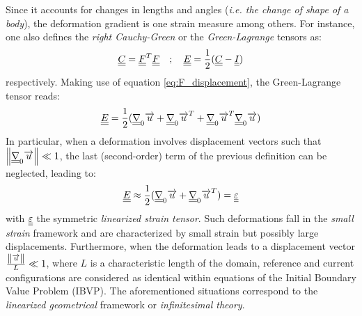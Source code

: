 Since it accounts for changes in lengths and angles (\textit{i.e. the change of shape of a body}), the deformation gradient is one strain measure among others. For instance, one also defines the \textit{right Cauchy-Green} or the \textit{Green-Lagrange} tensors as:
\begin{equation*}
  {\underline{\underline{C}}}={\underline{\underline{F}}}^T{\underline{\underline{F}}} \quad ; \quad {\underline{\underline{E}}}=\frac{1}{2}({\underline{\underline{C}}}-{\underline{\underline{I}}})
\end{equation*}
respectively. Making use of equation \eqref{eq:F_displacement}, the Green-Lagrange tensor reads:
\begin{equation*}
  {\underline{\underline{E}}}=\frac{1}{2}({\underline{\underline{\nabla}}}_0 {\overrightarrow{u}} + {\underline{\underline{\nabla}}}_0 {\overrightarrow{u}}^T + {\underline{\underline{\nabla}}}_0 {\overrightarrow{u}}^T {\underline{\underline{\nabla}}}_0 {\overrightarrow{u}})
\end{equation*}
In particular, when a deformation involves displacement vectors such that $\left\Vert{\underline{\underline{\nabla}}}_0 {\overrightarrow{u}}\right\Vert \ll 1$, the last (second-order) term of the previous definition can be neglected, leading to:
\begin{equation}
  \label{eq:epsilon}
  {\underline{\underline{E}}} \approx \frac{1}{2}({\underline{\underline{\nabla}}}_0 {\overrightarrow{u}} + {\underline{\underline{\nabla}}}_0 {\overrightarrow{u}}^T) = {\underline{\underline{\varepsilon}}}
\end{equation}
with ${\underline{\underline{\varepsilon}}}$ the symmetric \textit{linearized strain tensor}. Such deformations fall in the \textit{small strain } framework and are characterized by small strain but possibly large displacements. Furthermore, when the deformation leads to a displacement vector $\frac{\left\Vert{\overrightarrow{u}}\right\Vert}{L} \ll 1$, where $L$ is a characteristic length of the domain, reference and current configurations are considered as identical within equations of the Initial Boundary Value Problem (IBVP). The aforementioned situations correspond to the \textit{linearized geometrical} framework  or \textit{infinitesimal theory}.

